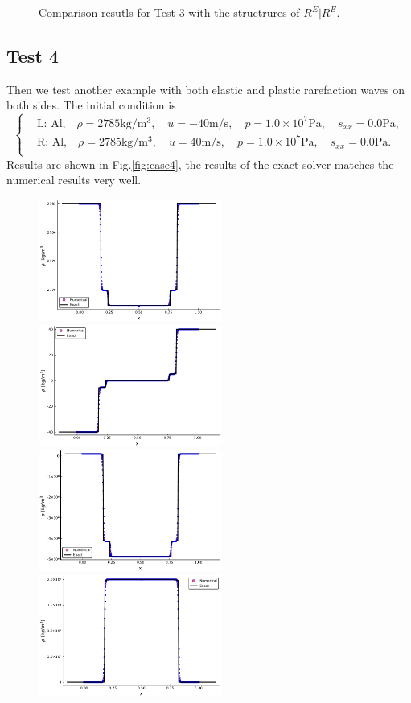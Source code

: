 \documentclass[review]{elsarticle}
\begin{document}
\begin{enumerate}[Step 1]
\begin{figure}
    \caption{Comparison resutls for Test 3 with the structrures of $R^E|R^E$.  }
  \label{fig:case3}
\end{figure}
\subsection{Test 4}
Then we test another example with both elastic and plastic rarefaction  waves on both sides. The initial condition is
\begin{equation}
 \left\{ \begin{aligned}
	 &	 \text{L: Al,}\quad  \rho = 2785 \text{kg}/\text{m}^3, \quad  u = -40\text{m}/\text{s}, \quad  p = 1.0\times 10^7 \text{Pa}, \quad  s_{xx}=0.0 \text{Pa},\\
	 &	 \text{R: Al,}\quad  \rho = 2785 \text{kg}/\text{m}^3, \quad  u = 40\text{m}/\text{s}, \quad  p = 1.0\times 10^7\text{Pa}, \quad  s_{xx}=0.0 \text{Pa}.\\
   \end{aligned}
 \right.
\end{equation}
Results are shown in Fig.\ref{fig:case4},  the results of the exact solver matches the numerical results very well.

\begin{figure}
  \centering

  \includegraphics[width= 6cm] {case3rho.pdf}
  \includegraphics[width= 6cm] {case3u.pdf}
  \includegraphics[width= 6cm] {case3p.pdf}
  \includegraphics[width= 6cm] {case3sxx.pdf}


\end{figure}
\end{enumerate}
\end{document}
